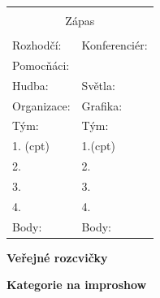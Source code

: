\documentclass[a4paper,10pt,openany]{book}
\begin{document}
\begin{multicols}{2}

 \begin{tabular}[t]{|p{4cm}|p{4cm}    |}
 \hline
 \multicolumn{2}{|c|}{ } \\
 \multicolumn{2}{|c|}{\large{Zápas}} \\
 \multicolumn{2}{|c|}{ } \\
 
  \hline
Rozhodčí:  & Konferenciér: \\
 \hline
\multicolumn{2}{|l|}{ Pomocňáci: }   \\ \hline
Hudba: & Světla: \\ \hline \hline
Organizace: & Grafika: \\ \hline \hline
Tým: &  Tým:\\ \hline
1. \small{(cpt)}  & 1.\small{(cpt)} \\ \hline
2.  & 2. \\ \hline
3. & 3. \\ \hline
4.  & 4. \\ \hline
Body:  & Body: \\ \hline

\end{tabular}
\vspace{3mm}

\end {multicols}
\renewcommand{\btbinfo}[6]{
\ifx Z#6  \else 
\large{#1 }

  \fi
}
\hline

\begin{multicols}{3}
\large{\textbf{Veřejné rozcvičky}}


\end {multicols}
\hline

\begin{multicols}{3}
\large{\textbf{Kategorie na improshow}}


\end {multicols}


\pagebreak
\newcommand{\faulinfo}[5]{
#4 & #1 & #3 & #5 \\

}

\begin{tabular}[t]{|p{3cm}|p{4cm}|p{1cm}|p{6cm}    |}

\end{tabular}
\pagebreak
\setcounter{tocdepth}{1}
\tableofcontents
\end{document}

